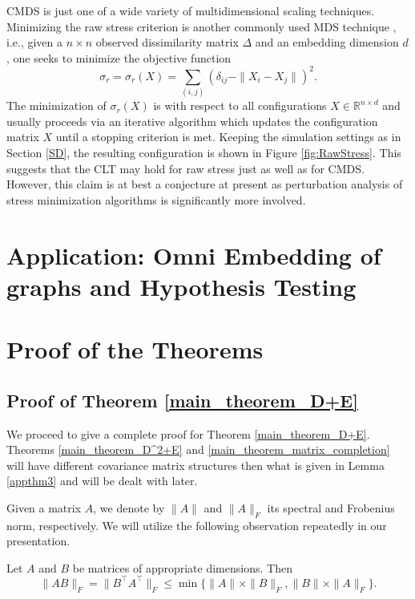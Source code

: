 CMDS is just one of a wide variety of multidimensional scaling techniques. Minimizing the raw stress criterion is another commonly used MDS technique \citep{Leeuw-Heiser}, i.e., given a $n \times n$ observed dissimilarity matrix $\Delta$ and an embedding dimension $d$, one seeks to minimize the objective function $$\sigma_r = \sigma_r(X) = \sum\limits_{(i,j)} (\delta_{ij} - \|X_i - X_j\|)^2.$$ The minimization of $\sigma_r(X)$ is with respect to all configurations $X \in \mathbb{R}^{n \times d}$ and usually proceeds via an iterative algorithm which updates the configuration matrix $X$ until a stopping criterion is met. Keeping the simulation settings as in Section \ref{SD},  the resulting configuration is shown in Figure \ref{fig:RawStress}. This suggests that the CLT may hold for raw stress just as well as for CMDS. However, this claim is at best a conjecture at present as perturbation analysis of stress minimization algorithms is significantly more involved.
\section{Application: Omni Embedding of graphs and Hypothesis Testing}










\section{Proof of the Theorems}

\subsection{Proof of Theorem \ref{main_theorem_D+E}}
\label{proof}
We proceed to give a complete proof for Theorem \ref{main_theorem_D+E}. Theorems \ref{main_theorem_D^2+E} and \ref{main_theorem_matrix_completion} will have different covariance matrix structures then what is given in Lemma \ref{appthm3} and will be dealt with later.

Given a matrix $A$, we denote by $\| A \|$ and $\|A\|_{F}$ its spectral and Frobenius norm, respectively.
We will utilize the following observation repeatedly in our presentation.
\begin{observation}
\label{appthm1}
 Let $A$ and $B$ be matrices of appropriate dimensions. Then 
 $$\|A B\|_F = \|B^{\top} A^{\top}\|_{F} \leq \min\{ \|A\| \times \|B\|_F, \|B\| \times \|A\|_{F}\}.$$
\end{observation}

